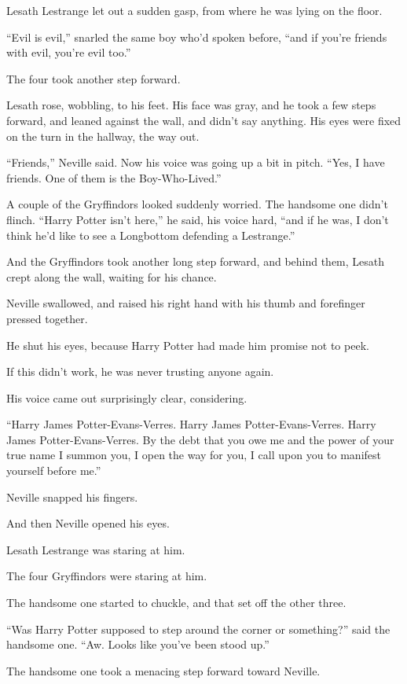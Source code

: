 Lesath Lestrange let out a sudden gasp, from where he was lying on the
floor.

``Evil is evil,'' snarled the same boy who'd spoken before, ``and if
you're friends with evil, you're evil too.''

The four took another step forward.

Lesath rose, wobbling, to his feet. His face was gray, and he took a few
steps forward, and leaned against the wall, and didn't say anything. His
eyes were fixed on the turn in the hallway, the way out.

``Friends,'' Neville said. Now his voice was going up a bit in pitch.
``Yes, I have friends. One of them is the Boy-Who-Lived.''

A couple of the Gryffindors looked suddenly worried. The handsome one
didn't flinch. ``Harry Potter isn't here,'' he said, his voice hard,
``and if he was, I don't think he'd like to see a Longbottom defending a
Lestrange.''

And the Gryffindors took another long step forward, and behind them,
Lesath crept along the wall, waiting for his chance.

Neville swallowed, and raised his right hand with his thumb and
forefinger pressed together.

He shut his eyes, because Harry Potter had made him promise not to peek.

If this didn't work, he was never trusting anyone again.

His voice came out surprisingly clear, considering.

``Harry James Potter-Evans-Verres. Harry James Potter-Evans-Verres.
Harry James Potter-Evans-Verres. By the debt that you owe me and the
power of your true name I summon you, I open the way for you, I call
upon you to manifest yourself before me.''

Neville snapped his fingers.

And then Neville opened his eyes.

Lesath Lestrange was staring at him.

The four Gryffindors were staring at him.

The handsome one started to chuckle, and that set off the other three.

``Was Harry Potter supposed to step around the corner or something?''
said the handsome one. ``Aw. Looks like you've been stood up.''

The handsome one took a menacing step forward toward Neville.

